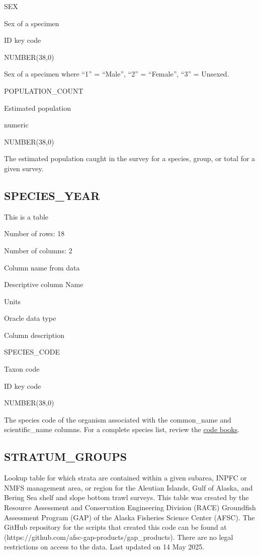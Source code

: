 \documentclass[
  letterpaper,
  oneside,
  open=any]{scrbook}
\begin{document}
SEX

Sex of a specimen

ID key code

NUMBER(38,0)

Sex of a specimen where ``1'' = ``Male'', ``2'' = ``Female'', ``3'' =
Unsexed.

POPULATION\_COUNT

Estimated population

numeric

NUMBER(38,0)

The estimated population caught in the survey for a species, group, or
total for a given survey.

\subsection{SPECIES\_YEAR}\label{species_year}

This is a table

Number of rows: 18

Number of columns: 2

Column name from data

Descriptive column Name

Units

Oracle data type

Column description

SPECIES\_CODE

Taxon code

ID key code

NUMBER(38,0)

The species code of the organism associated with the common\_name and
scientific\_name columns. For a complete species list, review the
\href{https://www.fisheries.noaa.gov/resource/document/groundfish-survey-species-code-manual-and-data-codes-manual}{code
books}.

\subsection{STRATUM\_GROUPS}\label{stratum_groups}

Lookup table for which strata are contained within a given subarea,
INPFC or NMFS management area, or region for the Aleutian Islands, Gulf
of Alaska, and Bering Sea shelf and slope bottom trawl surveys. This
table was created by the Resource Assessment and Conservation
Engineering Division (RACE) Groundfish Assessment Program (GAP) of the
Alaska Fisheries Science Center (AFSC). The GitHub repository for the
scripts that created this code can be found at
(https://github.com/afsc-gap-products/gap\_products). There are no legal
restrictions on access to the data. Last updated on 14 May 2025.
\end{document}
